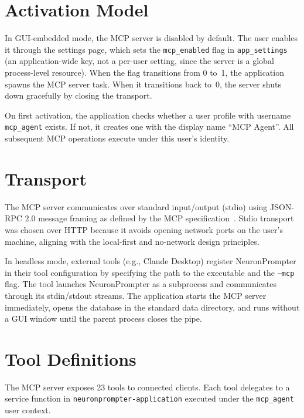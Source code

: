 \documentclass[a4paper, 11pt, oneside]{report}
\begin{document}
\section{Activation Model}
\label{sec:mcp-activation}

In GUI-embedded mode, the MCP server is disabled by default.  The user
enables it through the settings page, which sets the
\texttt{mcp\_enabled} flag in \texttt{app\_settings} (an application-wide
key, not a per-user setting, since the server is a global process-level
resource).  When the flag transitions from 0 to~1, the application
spawns the MCP server task.  When it transitions back to~0, the server
shuts down gracefully by closing the transport.

On first activation, the application checks whether a user profile with
username \texttt{mcp\_agent} exists.  If not, it creates one with the
display name ``MCP Agent''.  All subsequent MCP operations execute under
this user's identity.

\section{Transport}
\label{sec:mcp-transport}

The MCP server communicates over standard input/output (stdio) using
JSON-RPC 2.0 message framing as defined by the MCP
specification~\cite{mcp_spec}.  Stdio transport was chosen over HTTP
because it avoids opening network ports on the user's machine, aligning
with the local-first and no-network design principles.

In headless mode, external tools (e.g., Claude Desktop) register
NeuronPrompter in their tool configuration by specifying the path to
the executable and the \texttt{--mcp} flag.  The tool launches
NeuronPrompter as a subprocess and communicates through its stdin/stdout
streams.  The application starts the MCP server immediately, opens the
database in the standard data directory, and runs without a GUI window
until the parent process closes the pipe.

\section{Tool Definitions}
\label{sec:mcp-tools}

The MCP server exposes 23 tools to connected clients.  Each tool delegates
to a service function in \texttt{neuronprompter-application} executed under
the \texttt{mcp\_agent} user context.
\end{document}
